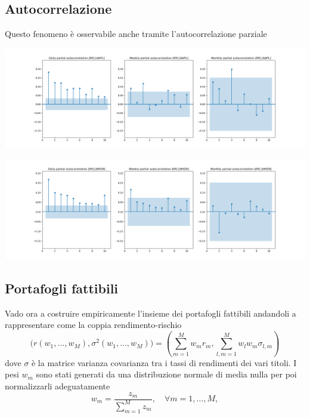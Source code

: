\documentclass[compress]{beamer}
\begin{document}
\subsection{Autocorrelazione}
\begin{frame}{\subsecname}
	Questo fenomeno è osservabile anche tramite l'autocorrelazione parziale
	\begin{minipage}{1\textwidth}
		\centering
		\includegraphics[width=0.8\linewidth]{images/partial_autocorrelation_abs_AAPL.png}
	\end{minipage}
	\vspace{-0.5cm}
	\begin{minipage}{1\textwidth}
		\centering
		\includegraphics[width=0.8\linewidth]{images/partial_autocorrelation_abs_AMZN.png}
	\end{minipage}
\end{frame}

\subsection{Portafogli fattibili}
\begin{frame}{\subsecname}
	Vado ora a costruire empiricamente l'insieme dei portafogli fattibili andandoli a rappresentare come la coppia rendimento-rischio
	\[
		\biggl( 
			r(w_{1},...,w_{M}), \sigma^{2}(w_{1},...,w_{M})
		\biggr)= 
		\left( \sum_{m=1}^{M}w_{m}r_{m}, \sum_{l,m=1}^{M}w_{l}w_{m}\sigma_{l,m} \right)
	\]
	dove \( \sigma \) è la matrice varianza covarianza tra i tassi di rendimenti dei vari titoli. I pesi \( w_m \) sono stati generati da una distribuzione normale di media nulla per poi normalizzarli adeguatamente
	\[
		w_m = \frac{z_m}{\sum_{m=1}^{M} z_m}, \quad \forall m = 1, \dots, M,
	\]
\end{frame}
\end{document}
